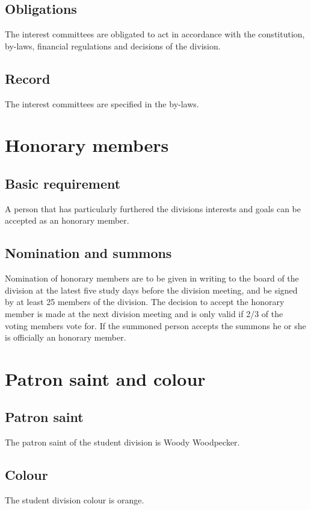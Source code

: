 \documentclass[a4paper]{dtek}
\begin{document}
\subsection{Obligations}
The interest committees are obligated to act in accordance with the constitution, by-laws, financial regulations and decisions of the division. 

\subsection{Record}
The interest committees are specified in the by-laws.
\newpage

\section{Honorary members}
\subsection{Basic requirement}
A person that has particularly furthered the divisions interests and goals can be accepted as an honorary member. 


\subsection{Nomination and summons}
Nomination of honorary members are to be given in writing to the board of the division at the latest five study days before the division meeting, and be signed by at least 25 members of the division. The decision to accept the honorary member is made at the next division meeting and is only valid if 2/3 of the voting members vote for. If the summoned person accepts the summons he or she is officially an honorary member. 


\newpage

\section{Patron saint and colour}
\subsection{Patron saint}
The patron saint of the student division is Woody Woodpecker. 

\subsection{Colour}
The student division colour is orange. 
\end{document}
